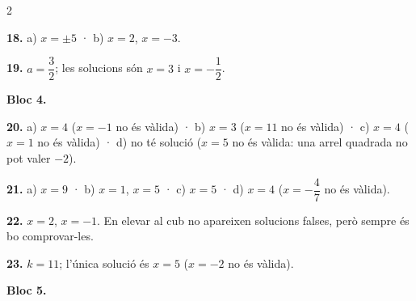 \documentclass[13pt,a4paper]{extarticle}
\begin{document}
\begin{multicols}{2}
\par\noindent\begin{minipage}{\linewidth}
\textbf{18.} a) $x=\pm5$ · b) $x=2$, $x=-3$.\par
\end{minipage}\par\vspace{1.6mm}
\par\noindent\begin{minipage}{\linewidth}
\textbf{19.} $a=\dfrac32$; les solucions són $x=3$ i $x=-\dfrac12$.\par
\end{minipage}\par\vspace{1.6mm}
\textbf{Bloc 4.}\par
\par\noindent\begin{minipage}{\linewidth}
\textbf{20.} a) $x=4$ ($x=-1$ no és vàlida) · b) $x=3$ ($x=11$ no és vàlida) · c) $x=4$ ($x=1$ no és vàlida) · d) no té solució ($x=5$ no és vàlida: una arrel quadrada no pot valer $-2$).\par
\end{minipage}\par\vspace{1.6mm}
\par\noindent\begin{minipage}{\linewidth}
\textbf{21.} a) $x=9$ · b) $x=1$, $x=5$ · c) $x=5$ · d) $x=4$ ($x=-\dfrac47$ no és vàlida).\par
\end{minipage}\par\vspace{1.6mm}
\par\noindent\begin{minipage}{\linewidth}
\textbf{22.} $x=2$, $x=-1$. En elevar al cub no apareixen solucions falses, però sempre és bo comprovar-les.\par
\end{minipage}\par\vspace{1.6mm}
\par\noindent\begin{minipage}{\linewidth}
\textbf{23.} $k=11$; l'única solució és $x=5$ ($x=-2$ no és vàlida).\par
\end{minipage}\par\vspace{1.6mm}
\textbf{Bloc 5.}\par

\end{multicols}
\end{document}
